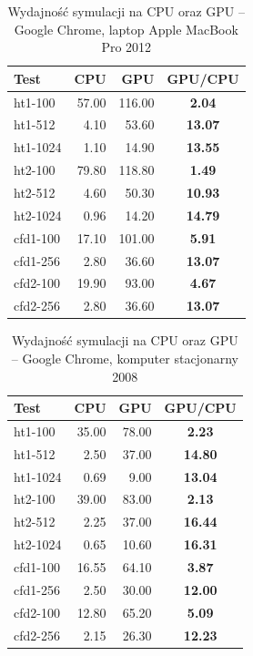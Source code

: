 \begin{table}[!htp]
\caption{Wydajność symulacji na CPU oraz GPU -- Google Chrome, laptop Apple MacBook Pro 2012}
\centering
\begin{tabular}{|l|r|r|>{\bfseries}c|}
\hline
\cellcolor{t} Test & \cellcolor{cpu} CPU & \cellcolor{gpu} GPU & \cellcolor{gc} GPU/CPU \\ \hline
ht1-100 & 57.00 & 116.00 & 2.04 \\ \hline
ht1-512 & 4.10 & 53.60 & 13.07 \\ \hline
ht1-1024 & 1.10 & 14.90 & 13.55 \\ \hline
ht2-100 & 79.80 & 118.80 & 1.49 \\ \hline
ht2-512 & 4.60 & 50.30 & 10.93 \\ \hline
ht2-1024 & 0.96 & 14.20 & 14.79 \\ \hline
\hline
cfd1-100 & 17.10 & 101.00 & 5.91 \\ \hline
cfd1-256 & 2.80 & 36.60 & 13.07 \\ \hline
cfd2-100 & 19.90 & 93.00 & 4.67 \\ \hline
cfd2-256 & 2.80 & 36.60 & 13.07 \\ \hline
\end{tabular}
\label{tab:wynikiWebGL_3}
\end{table}

\begin{table}[!htp]
\caption{Wydajność symulacji na CPU oraz GPU -- Google Chrome, komputer stacjonarny 2008}
\centering
\begin{tabular}{|l|r|r|>{\bfseries}c|}
\hline
\cellcolor{t} Test & \cellcolor{cpu} CPU & \cellcolor{gpu} GPU & \cellcolor{gc} GPU/CPU \\ \hline
ht1-100 & 35.00 & 78.00 & 2.23 \\ \hline
ht1-512 & 2.50 & 37.00 & 14.80 \\ \hline
ht1-1024 & 0.69 & 9.00 & 13.04 \\ \hline
ht2-100 & 39.00 & 83.00 & 2.13 \\ \hline
ht2-512 & 2.25 & 37.00 & 16.44 \\ \hline
ht2-1024 & 0.65 & 10.60 & 16.31 \\ \hline
\hline
cfd1-100 & 16.55 & 64.10 & 3.87 \\ \hline
cfd1-256 & 2.50 & 30.00 & 12.00 \\ \hline
cfd2-100 & 12.80 & 65.20 & 5.09 \\ \hline
cfd2-256 & 2.15 & 26.30 & 12.23 \\ \hline
\end{tabular}
\label{tab:wynikiWebGL_4}
\end{table}

